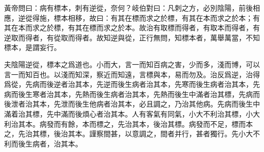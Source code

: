 \documentclass[draft,12pt]{ctexbook}
\begin{document}
\begin{yuanwen}
黃帝問曰：病有標本，刺有逆從，奈何？岐伯對曰：凡刺之方，必別陰陽，前後相應，逆從得施，標本相移，故曰：有其在標而求之於標，有其在本而求之於本；有其在本而求之於標，有其在標而求之於本。故治有取標而得者，有取本而得者，有逆取而得者，有從取而得者。故知逆與從，正行無問，知標本者，萬舉萬當，不知標本，是謂妄行。

夫陰陽逆從，標本之爲道也。小而大，言一而知百病之害，少而多，淺而博，可以言一而知百也。以淺而知深，察近而知遠，言標與本，易而勿及。治反爲逆，治得爲從，先病而後逆者治其本，先逆而後生病者治其本，先寒而後生病者治其本，先病而後生寒者治其本，先熱而後生病者治其本，先熱而後生中滿者治其標，先病而後泄者治其本，先泄而後生他病者治其本，必且調之，乃治其他病。先病而後生中滿着治其標，先中滿而後煩心者治其本。人有客氣有同氣，小大不利治其標，小大利治其本。病發而有餘，本而標之，先治其本，後治其標。病發而不足，標而本之，先治其標，後治其本。謹察間甚，以意調之，間者并行，甚者獨行。先小大不利而後生病者，治其本。
\end{yuanwen}

\end{document}
